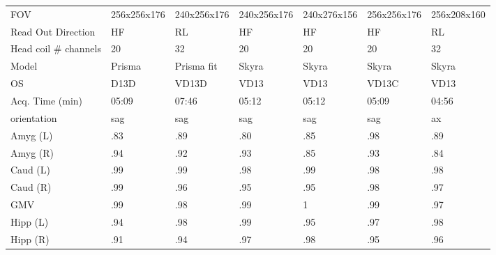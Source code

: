 \begin{table}
{\begin{tabular}{lllllll}
FOV                   &          256x256x176 &          240x256x176 &        240x256x176 &         240x276x156 &         256x256x176 &         256x208x160 \\
Read Out Direction    &                   HF &                   RL &                 HF &                  HF &                  HF &                  RL \\
Head coil \# channels  &                   20 &                   32 &                 20 &                  20 &                  20 &                  32 \\
Model                 &               Prisma &           Prisma fit &              Skyra &               Skyra &               Skyra &               Skyra \\
OS                    &                 D13D &                VD13D &               VD13 &                VD13 &               VD13C &                VD13 \\
Acq. Time (min)       &             05:09 &             07:46 &           05:12 &            05:12 &            05:09 &            04:56 \\
orientation           &                  sag &                  sag &                sag &                 sag &                 sag &                  ax \\
Amyg (L)              &                 .83 &                 .89 &               .80 &                .85 &                .98 &                .89 \\
Amyg (R)              &                 .94 &                 .92 &               .93 &                .85 &                .93 &                .84 \\
Caud (L)              &                 .99 &                 .99 &               .98 &                .99 &                .98 &                .98 \\
Caud (R)              &                 .99 &                 .96 &               .95 &                .95 &                .98 &                .97 \\
GMV                   &                 .99 &                 .98 &               .99 &                1   &                .99 &                .97 \\
Hipp (L)              &                 .94 &                 .98 &               .99 &                .95 &                .97 &                .98 \\
Hipp (R)              &                 .91 &                 .94 &               .97 &                .98 &                .95 &                .96 \\

\end{tabular}}
\end{table}
